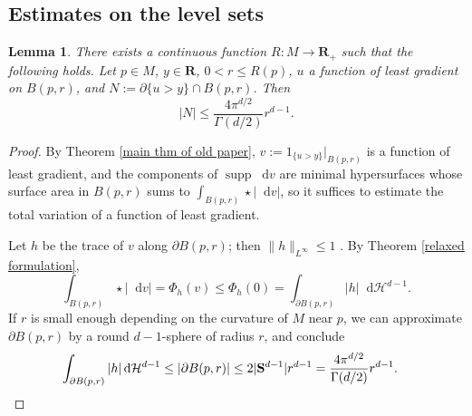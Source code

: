 \documentclass[reqno,11pt]{amsart}
\newcommand{\RR}{\mathbf{R}}
\newcommand{\Sph}{\mathbf S}
\newcommand*\dif{\mathop{}\!\mathrm{d}}
\DeclareMathOperator{\supp}{supp}
\newtheorem{lemma}[theorem]{Lemma}
\theoremstyle{definition}
\numberwithin{equation}{section}
\begin{document}
\subsection{Estimates on the level sets}
\begin{lemma}
There exists a continuous function $R: M \to \RR_+$ such that the following holds.
Let $p \in M$, $y \in \RR$, $0 < r \leq R(p)$, $u$ a function of least gradient on $B(p, r)$, and $N := \partial \{u > y\} \cap B(p, r)$.
Then 
\begin{equation}\label{least gradient area bound}
|N| \leq \frac{4\pi^{d/2}}{\Gamma(d/2)} r^{d - 1}.
\end{equation}
\end{lemma}
\begin{proof}
By Theorem \ref{main thm of old paper}, $v := 1_{\{u > y\}}|_{B(p, r)}$ is a function of least gradient, and the components of $\supp \dif v$ are minimal hypersurfaces whose surface area in $B(p, r)$ sums to $\int_{B(p, r)} \star |\dif v|$, so it suffices to estimate the total variation of a function of least gradient.

Let $h$ be the trace of $v$ along $\partial B(p, r)$; then $\|h\|_{L^\infty} \leq 1$ \cite[Theorem 2.10]{Giusti77}.
By Theorem \ref{relaxed formulation},
$$\int_{B(p, r)} \star |\dif v| = \Phi_h(v) \leq \Phi_h(0) = \int_{\partial B(p, r)} |h| \dif \mathcal H^{d - 1}.$$
If $r$ is small enough depending on the curvature of $M$ near $p$, we can approximate $\partial B(p, r)$ by a round $d - 1$-sphere of radius $r$, and conclude
\begin{align*}
	\int_{\partial B(p, r)} |h| \dif \mathcal H^{d - 1} &\leq |\partial B(p, r)| \leq 2|\Sph^{d - 1}| r^{d - 1} = \frac{4\pi^{d/2}}{\Gamma(d/2)} r^{d - 1}. \qedhere
\end{align*}
\end{proof}
\end{document}
